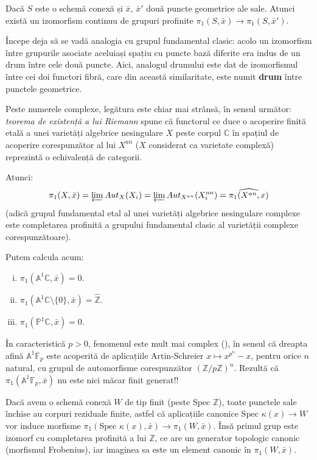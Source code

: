 \documentclass[13pt,openany,oneside]{book}
\begin{document}
\begin{cor}
Dacă $S$ este o schemă conexă și $\bar{x}$, $\bar{x}'$ două puncte geometrice ale sale. Atunci există un izomorfism continuu de grupuri profinite $\pi_1(S,\bar{x}) \rightarrow \pi_1(S,\bar{x}')$.
\end{cor}

Începe deja să se vadă analogia cu grupul fundamental clasic: acolo un izomorfism între grupurile asociate aceluiași spațiu cu puncte bază diferite era indus de un drum între cele două puncte. Aici, analogul drumului este dat de izomorfismul între cei doi functori fibră, care din această similaritate, este numit {\bf drum} între punctele geometrice.

Peste numerele complexe, legătura este chiar mai strânsă, în sensul următor: {\it teorema de existență a lui Riemann} spune că functorul ce duce o acoperire finită etală a unei varietăți algebrice nesingulare $X$ peste corpul $\mathbb{C}$ în spațiul de acoperire corespunzător al lui $X^{an}$ ($X$ considerat ca varietate complexă) reprezintă o echivalență de categorii.

Atunci:
$$\pi_1(X,\bar{x}) = \varprojlim Aut_X(X_i) = \varprojlim Aut_{X^{an}}(X_i^{an}) = \widehat{\pi_1(X^{an},x)}$$
(adică grupul fundamental etal al unei varietăți algebrice nesingulare complexe este completarea profinită a grupului fundamental clasic al varietății complexe corespunzătoare).

\begin{exs}
Putem calcula acum:
\begin{enumerate}[i)]
\item $\pi_1(\mathbb{A}^1\mathbb{C},\bar{x}) = 0$.

\item $\pi_1(\mathbb{A}^1\mathbb{C} \setminus \{0\},\bar{x}) = \hat{\mathbb{Z}}$.

\item $\pi_1(\mathbb{P}^1\mathbb{C},\bar{x}) = 0$.
\end{enumerate}
\end{exs}

În caracteristică $p > 0$, fenomenul este mult mai complex (\cite{clark}), în sensul că dreapta afină $\mathbb{A}^1\mathbb{F}_p$ este acoperită de aplicațiile Artin-Schreier $x \mapsto x^{p^n}-x$, pentru orice $n$ natural, cu grupul de automorfisme corespunzător $(\mathbb{Z}/p\mathbb{Z})^n$. Rezultă că $\pi_1(\mathbb{A}^1\mathbb{F}_p,\bar{x})$ nu este nici măcar finit generat!!

Dacă avem o schemă conexă $W$ de tip finit (peste Spec $\mathbb{Z}$), toate punctele sale închise au corpuri reziduale finite, astfel că aplicațiile canonice Spec $\kappa(x) \rightarrow W$ vor induce morfisme $\pi_1(\text{Spec }\kappa(x),\bar{x}) \rightarrow \pi_1(W,\bar{x})$. Însă primul grup este izomorf cu completarea profinită a lui $\mathbb{Z}$, ce are un generator topologic canonic (morfismul Frobenius), iar imaginea sa este un element canonic în $ \pi_1(W,\bar{x})$.
\end{document}
